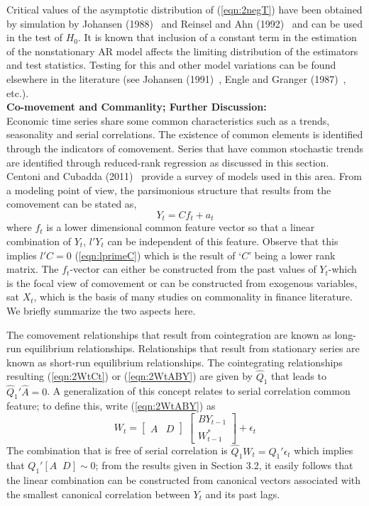 Critical values of the asymptotic distribution of (\ref{eqn:2negT}) have been obtained by simulation by Johansen (1988)~\cite{johansen1988statistical} and Reinsel and Ahn (1992)~\cite{reinsel1992vector} and can be used in the test of $H_0$. It is known that inclusion of a constant term in the estimation of the nonstationary AR model affects the limiting distribution of the estimators and test statistics. Testing for this and other model variations can be found elsewhere in the literature (see Johansen (1991)~\cite{johansen1991estimation}, Engle and Granger (1987)~\cite{engle1987co}, etc.). \\


\noindent \textbf{Co-movement and Commanlity; Further Discussion:} \\


Economic time series share some common characteristics such as a trends, seasonality and serial correlations. The existence of common elements is identified through the indicators of comovement. Series that have common stochastic trends are identified through reduced-rank regression as discussed in this section. Centoni and Cubadda (2011)~\cite{centoni} provide a survey of models used in this area. From a modeling point of view, the parsimonious structure that results from the comovement can be stated as,
	\begin{equation}\label{eqn:discyt}
	Y_t= Cf_t + a_t
	\end{equation}  
where $f_t$ is a lower dimensional common feature vector so that a linear combination of $Y_t$, $l' Y_t$ can be independent of this feature. Observe that this implies $l'C=0$ (\ref{eqn:lprimeC}) which is the result of `$C$' being a lower rank matrix. The $f_t$-vector can either be constructed from the past values of $Y_t$-which is the focal view of comovement or can be constructed from exogenous variables, sat $X_t$, which is the basis of many studies on commonality in finance literature. We briefly summarize the two aspects here. 


The comovement relationships that result from cointegration are known as long-run equilibrium relationships. Relationships that result from stationary series are known as short-run equilibrium relationships. The cointegrating relationships resulting (\ref{eqn:2WtCt}) or (\ref{eqn:2WtABY}) are given by $\hat{Q}_1$ that leads to $\hat{Q}_1' \hat{A}=0$. A generalization of this concept relates to serial correlation common feature; to define this, write (\ref{eqn:2WtABY}) as
	\begin{equation}\label{eqn:wtrewrite}
	W_t=  \begin{bmatrix} A & D \end{bmatrix} \; \begin{bmatrix} BY_{t-1} \\ W_{t-1}^* \end{bmatrix} + \epsilon_t
	\end{equation}
The combination that is free of serial correlation is $\hat{Q}_1W_t= Q_1' \epsilon_t$ which implies that $Q_1' [A \;\; D] \sim 0$; from the results given in Section 3.2, it easily follows that the linear combination can be constructed from canonical vectors associated with the smallest canonical correlation between $Y_t$ and its past lags.


